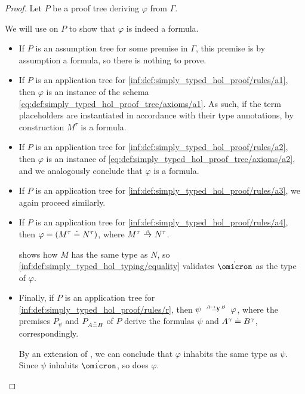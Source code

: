\begin{proof}
  Let \( P \) be a proof tree deriving \( \varphi \) from \( \Gamma \).

  We will use  on \( P \) to show that \( \varphi \) is indeed a formula.
  \begin{itemize}
    \item If \( P \) is an assumption tree for some premise in \( \Gamma \), this premise is by assumption a formula, so there is nothing to prove.

    \item If \( P \) is an application tree for \ref{inf:def:simply_typed_hol_proof/rules/a1}, then \( \varphi \) is an instance of the schema \eqref{eq:def:simply_typed_hol_proof_tree/axioms/a1}. As such, if the term placeholders are instantiated in accordance with their type annotations, by construction \( M^\tau \) is a formula.

    \item If \( P \) is an application tree for \ref{inf:def:simply_typed_hol_proof/rules/a2}, then \( \varphi \) is an instance of \eqref{eq:def:simply_typed_hol_proof_tree/axioms/a2}, and we analogously conclude that \( \varphi \) is a formula.

    \item If \( P \) is an application tree for \ref{inf:def:simply_typed_hol_proof/rules/a3}, we again proceed similarly.

    \item If \( P \) is an application tree for \ref{inf:def:simply_typed_hol_proof/rules/a4}, then \( \varphi = (M^\tau \doteq N^\tau) \), where \( M^\tau \bred N^\tau \).

     shows how \( M \) has the same type as \( N \), so \ref{inf:def:simply_typed_hol_typing/equality} validates \( \syn\omicron \) as the type of \( \varphi \).

    \item Finally, if \( P \) is an application tree for \ref{inf:def:simply_typed_hol_proof/rules/r}, then \( \psi \redrel{A \mapsto_V B} \varphi \), where the premises \( P_\psi \) and \( P_{A \doteq B} \) of \( P \) derive the formulas \( \psi \) and \( A^\gamma \doteq B^\gamma \), correspondingly.

    By an extension of , we can conclude that \( \varphi \) inhabits the same type as \( \psi \). Since \( \psi \) inhabits \( \syn\omicron \), so does \( \varphi \).
  \end{itemize}
\end{proof}

